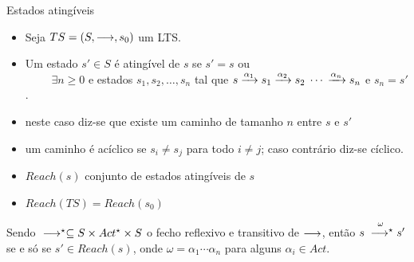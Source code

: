 \documentclass[aspectratio=169]{beamer}
\begin{document}
\begin{frame}{Estados atingíveis}
  \begin{itemize}
    \item Seja $TS=(S,\longrightarrow,s_0)$ um LTS. 
    \item Um estado $s'\in S$ é \alert{atingível} de $s$ se $s'=s$  ou
\\~~~~
$\exists n\geq 0$ e estados $s_1,s_2,\ldots , s_n$ tal que
${s}\xrightarrow{\alpha_1}{s_1}{}\xrightarrow{\alpha_2}{s_2}\;\cdots{}\xrightarrow{\alpha_n}{s_n}$ e $s_n=s'$.
\item neste caso diz-se que existe um \alert{caminho} de tamanho $n$ entre $s$ e $s'$ 
\item um caminho  é \alert{acíclico} se $s_i\not=s_j$ para todo $i\not=j$; caso contrário diz-se cíclico.

\item $Reach(s)$ conjunto de estados atingíveis de $s$
\item $Reach(TS)=Reach(s_0)$

\end{itemize}
Sendo $\;\longrightarrow^\star\subseteq S\times Act^\star \times S$ o fecho reflexivo e transitivo de $\longrightarrow$,  então  $
s\stackrel{\omega}{\;\longrightarrow^\star}s'$ se e só se $s'\in Reach(s)$, onde $\omega=\alpha_1\cdots \alpha_n$ para alguns $\alpha_i\in Act$.
\end{frame}
\end{document}
